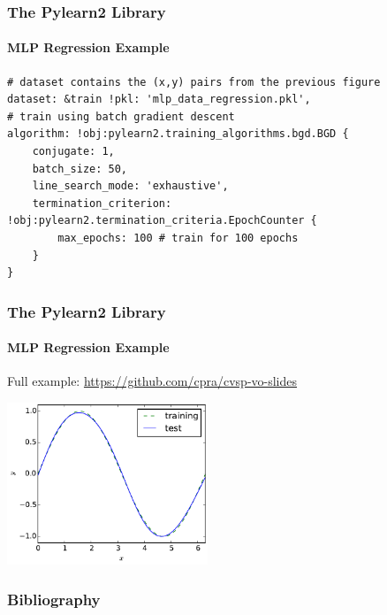 \documentclass[xetex,professionalfont]{beamer}
\begin{document}
\begin{frame}[fragile]
\frametitle{The Pylearn2 Library}
\framesubtitle{MLP Regression Example}

\begin{verbatim}
# dataset contains the (x,y) pairs from the previous figure
dataset: &train !pkl: 'mlp_data_regression.pkl',
# train using batch gradient descent
algorithm: !obj:pylearn2.training_algorithms.bgd.BGD {
    conjugate: 1,
    batch_size: 50,
    line_search_mode: 'exhaustive',
    termination_criterion: !obj:pylearn2.termination_criteria.EpochCounter {
        max_epochs: 100 # train for 100 epochs
    }
}
\end{verbatim}

\end{frame}


\begin{frame}
\frametitle{The Pylearn2 Library}
\framesubtitle{MLP Regression Example}

Full example: \url{https://github.com/cpra/cvsp-vo-slides}

\medskip
\begin{center}
	\includegraphics[width=6cm]{figures/mlp-regression.pdf} %
\end{center}

\end{frame}


\begin{frame}[allowframebreaks=0.9]
\frametitle{Bibliography}

\printbibliography

\end{frame}
\end{document}
